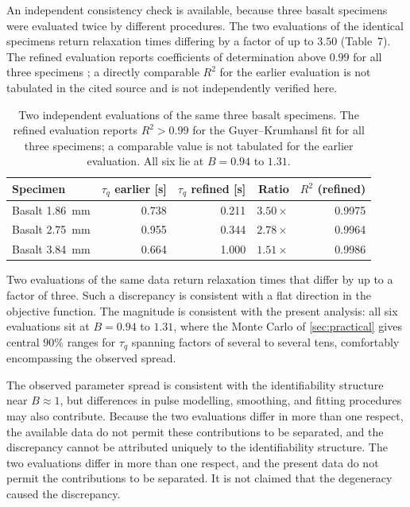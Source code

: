 \documentclass[preprint,12pt,a4paper]{elsarticle}
\theoremstyle{plain}
\theoremstyle{definition}
\theoremstyle{remark}
\newcommand{\tq}{\tau_{q}}
\newcommand{\Bnum}{B}
\begin{document}
An independent consistency check is available, because three basalt specimens
were evaluated twice by different procedures. The two evaluations of the
identical specimens return relaxation times differing by a factor of up to
$3.50$ (Table~7). The refined evaluation reports
coefficients of determination above $0.99$ for all three specimens
\cite{FeherKovacs2021}; a directly comparable $R^{2}$ for the earlier
evaluation is not tabulated in the cited source and is not independently
verified here.
\begin{table}[htbp]
  \centering
  \caption{Two independent evaluations of the same three basalt specimens.
           The refined evaluation reports $R^{2}>0.99$ for the
           Guyer--Krumhansl fit for all three specimens; a comparable value is
           not tabulated for the earlier evaluation. All six lie at
           $\Bnum=0.94$ to $1.31$.}
  \label{tab:discrepancy}
  \small
  \begin{tabular}{@{}lrrrr@{}}
    \toprule
    \textbf{Specimen} & $\tq$ earlier [\si{\second}] &
    $\tq$ refined [\si{\second}] & \textbf{Ratio} &
    $R^{2}$ (refined) \\
    \midrule
    Basalt \SI{1.86}{\milli\metre} & 0.738 & 0.211 & $3.50\times$ & 0.9975 \\
    Basalt \SI{2.75}{\milli\metre} & 0.955 & 0.344 & $2.78\times$ & 0.9964 \\
    Basalt \SI{3.84}{\milli\metre} & 0.664 & 1.000 & $1.51\times$ & 0.9986 \\
    \bottomrule
  \end{tabular}
\end{table}


Two evaluations of the same data return relaxation times that differ by up to
a factor of three. Such a discrepancy is consistent with a flat direction in
the objective function. The magnitude is consistent with the
present analysis: all six evaluations sit at $\Bnum = 0.94$ to $1.31$, where
the Monte Carlo of \cref{sec:practical} gives central $90\%$ ranges for $\tq$
spanning factors of several to several tens, comfortably encompassing the
observed spread.

The observed parameter spread is consistent with the identifiability structure
near $\Bnum \approx 1$, but differences in pulse modelling, smoothing, and
fitting procedures may also contribute. Because the two evaluations differ in
more than one respect, the available data do not permit these contributions to
be separated, and the discrepancy cannot be attributed uniquely to the
identifiability structure. The two evaluations
differ in more than one respect, and the present data do not permit the
contributions to be separated. It is not claimed that the degeneracy caused the
discrepancy.
\end{document}
